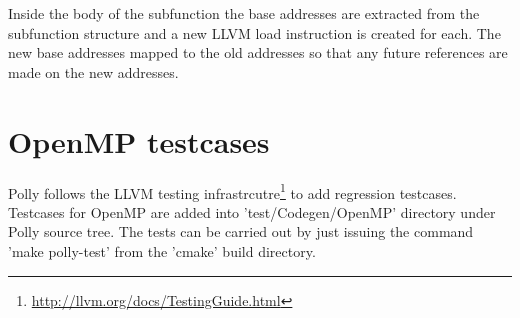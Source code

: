 Inside the body of the subfunction the base addresses are extracted from the subfunction structure and a new LLVM load instruction is created for each. The
new base addresses mapped to the old addresses so that any future references are made on the new addresses.

\section{OpenMP testcases}

Polly follows the LLVM testing infrastrcutre\footnote{\url{http://llvm.org/docs/TestingGuide.html}} to add regression testcases. Testcases for OpenMP are added into
'test/Codegen/OpenMP' directory under Polly source tree. The tests can be carried out by just issuing the command 'make polly-test'
from the 'cmake' build directory.
